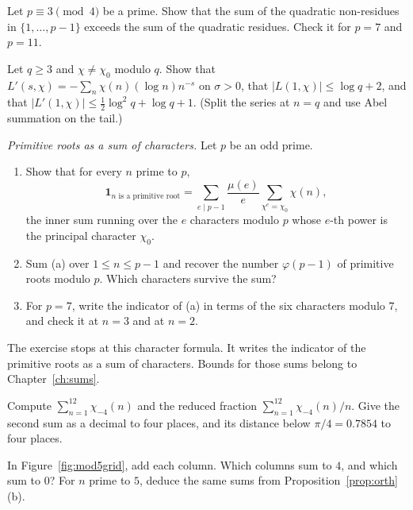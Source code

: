 \begin{exercise}[$\star\star$]\label{ex:residuesum}
Let $p\equiv3\pmod4$ be a prime. Show that the sum of the quadratic non-residues in $\{1,\dots,p-1\}$ exceeds the sum of the quadratic
residues. Check it for $p=7$ and $p=11$.
\end{exercise}

\begin{exercise}[$\star\star$]\label{ex:lderivative}
Let $q\ge3$ and $\chi\ne\chi_0$ modulo $q$. Show that $L'(s,\chi)=-\sum_n\chi(n)(\log n)n^{-s}$ on $\sigma>0$, that $|L(1,\chi)|\le\log q+2$, and that
$|L'(1,\chi)|\le\frac12\log^2q+\log q+1$. (Split the series at $n=q$ and use Abel summation on the tail.)
\end{exercise}

\begin{exercise}[$\star\star\star$]\label{pb:primroot}
\emph{Primitive roots as a sum of characters.} Let $p$ be an odd prime.
\begin{enumerate}[label=(\alph*)]
\item Show that for every $n$ prime to $p$,
\[
\mathbf 1_{\text{$n$ is a primitive root}}=\sum_{e\mid p-1}\frac{\mu(e)}e\sum_{\chi^e=\chi_0}\chi(n),
\]
the inner sum running over the $e$ characters modulo $p$ whose $e$-th power is the principal character $\chi_0$.
\item Sum (a) over $1\le n\le p-1$ and recover the number $\varphi(p-1)$ of primitive roots modulo $p$. Which characters survive the sum?
\item For $p=7$, write the indicator of (a) in terms of the six characters modulo $7$, and check it at $n=3$ and at $n=2$.
\end{enumerate}
The exercise stops at this character formula. It writes the indicator of the primitive roots as a sum of characters. Bounds for those sums belong to Chapter~\ref{ch:sums}.
\end{exercise}

\begin{exercise}[$\star$]\label{ex:chi4partial}
Compute $\sum_{n=1}^{12}\chi_{-4}(n)$ and the reduced fraction $\sum_{n=1}^{12}\chi_{-4}(n)/n$. Give the second sum as a decimal to four places, and its distance below $\pi/4=0.7854$ to four places.
\end{exercise}

\begin{exercise}[$\star\star$]\label{ex:mod5cols}
In Figure~\ref{fig:mod5grid}, add each column. Which columns sum to $4$, and which sum to $0$? For $n$ prime to $5$, deduce the same sums from Proposition~\ref{prop:orth}(b).
\end{exercise}

